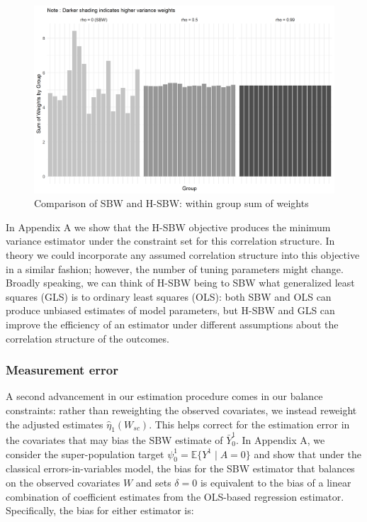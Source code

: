 \documentclass[aoas]{imsart}
\theoremstyle{plain}
\theoremstyle{remark}
\begin{document}
\begin{figure}
\begin{center}
    \includegraphics[scale=0.5]{01_Plots/proofofconcept.png}
    \caption{Comparison of SBW and H-SBW: within group sum of weights}
    \label{oatepref}
\end{center}
\end{figure}

In Appendix A we show that the H-SBW objective produces the minimum variance estimator under the constraint set for this correlation structure. In theory we could incorporate any assumed correlation structure into this objective in a similar fashion; however, the number of tuning parameters might change. Broadly speaking, we can think of H-SBW being to SBW what generalized least squares (GLS) is to ordinary least squares (OLS): both SBW and OLS can produce unbiased estimates of model parameters, but H-SBW and GLS can improve the efficiency of an estimator under different assumptions about the correlation structure of the outcomes.

\subsubsection{Measurement error}\label{ssec:methodsmsrment}

A second advancement in our estimation procedure comes in our balance constraints: rather than reweighting the observed covariates, we instead reweight the adjusted estimates $\hat{\eta}_1(W_{sc})$. This helps correct for the estimation error in the covariates that may bias the SBW estimate of $\bar{Y}_0^1$. In Appendix A, we consider the super-population target $\psi^1_0 = \mathbb{E}\{Y^1 \mid A = 0\}$ and show that under the classical errors-in-variables model, the bias for the SBW estimator that balances on the observed covariates $W$ and sets $\delta = 0$ is equivalent to the bias of a linear combination of coefficient estimates from the OLS-based regression estimator. Specifically, the bias for either estimator is:
\end{document}
